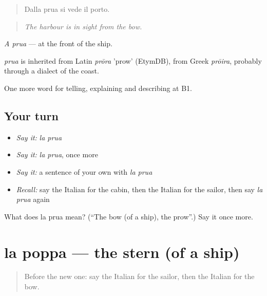 \begin{quote}
Dalla prua si vede il porto.
\end{quote}

\begin{quote}
\emph{The harbour is in sight from the bow.}
\end{quote}

\emph{A prua} — at the front of the ship.

\begin{cousinweb}
\emph{prua} is inherited from Latin \emph{prōra} 'prow' (EtymDB), from Greek \emph{prōira}, probably through a dialect of the coast.
\end{cousinweb}

\begin{grammarlens}[title={What you've built}]
One more word for telling, explaining and describing at B1.
\end{grammarlens}

\subsection*{Your turn}
\begin{itemize}
\raggedright
  \item \emph{Say it:} \emph{la prua}
  \item \emph{Say it:} \emph{la prua}, once more
  \item \emph{Say it:} a sentence of your own with \emph{la prua}
  \item \emph{Recall:} say the Italian for the cabin, then the Italian for the sailor, then say \emph{la prua} again
\end{itemize}

\begin{tcolorbox}[breakable,colback=teal!4,colframe=teal!35!black,title={Before you move on}]
What does la prua mean? (\textquotedblleft{}The bow (of a ship), the prow\textquotedblright{}.) Say it once more.
\end{tcolorbox}
\section[la poppa]{la poppa — the stern (of a ship)}

\label{lesson:IT-C423-poppa}



\begin{quote}
Before the new one: say the Italian for the sailor, then the Italian for the bow.
\end{quote}

